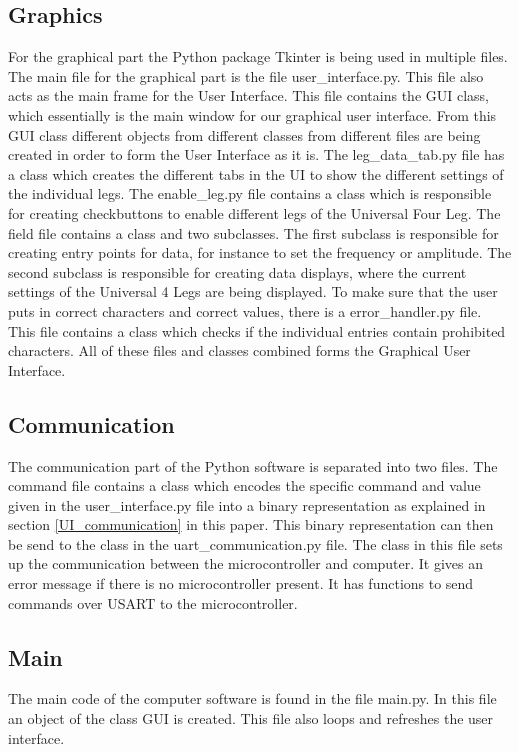 \documentclass[conference]{IEEEtran}
\begin{document}
\subsection{Graphics}
For the graphical part the Python package Tkinter is being used in multiple files. The main file for the graphical part is the file user\_interface.py. This file also acts as the main frame for the User Interface. This file contains the GUI class, which essentially is the main window for our graphical user interface. From this GUI class different objects from different classes from different files are being created in order to form the User Interface as it is. The leg\_data\_tab.py file has a class which creates the different tabs in the UI to show the different settings of the individual legs. The enable\_leg.py file contains a class which is responsible for creating checkbuttons to enable different legs of the Universal Four Leg. The field file contains a class and two subclasses. The first subclass is responsible for creating entry points for data, for instance to set the frequency or amplitude. The second subclass is responsible for creating data displays, where the current settings of the Universal 4 Legs are being displayed. To make sure that the user puts in correct characters and correct values, there is a error\_handler.py file. This file contains a class which checks if the individual entries contain prohibited characters. All of these files and classes combined forms the Graphical User Interface.

\subsection{Communication}
The communication part of the Python software is separated into two files. The command file contains a class which encodes the specific command and value given in the user\_interface.py file into a binary representation as explained in section \ref{UI_communication} in this paper. This binary representation can then be send to the class in the uart\_communication.py file. The class in this file sets up the communication between the microcontroller and computer. It gives an error message if there is no microcontroller present. It has functions to send commands over USART to the microcontroller.

\subsection{Main}
The main code of the computer software is found in the file main.py. In this file an object of the class GUI is created. This file also loops and refreshes the user interface.
\end{document}

